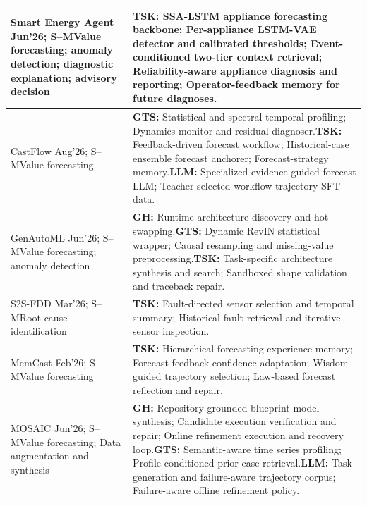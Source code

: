 \documentclass[preprints,article,submit,moreauthors]{Definitions/mdpi}
\newcommand{\typeSMshort}{\textsf{S--M}}
\begin{document}
\begin{longtable}{@{}>{\raggedright\arraybackslash}p{}p{}@{}}
Smart Energy Agent \citep{smartenergyagent2026} Jun'26; \typeSMshort{}\newline Value forecasting; anomaly detection; diagnostic explanation; advisory decision & \textbf{TSK:} SSA-LSTM appliance forecasting backbone; Per-appliance LSTM-VAE detector and calibrated thresholds; Event-conditioned two-tier context retrieval; Reliability-aware appliance diagnosis and reporting; Operator-feedback memory for future diagnoses.\\\midrule
CastFlow \citep{castflow2026} Aug'26; \typeSMshort{}\newline Value forecasting & \textbf{GTS:} Statistical and spectral temporal profiling; Dynamics monitor and residual diagnoser.\newline\textbf{TSK:} Feedback-driven forecast workflow; Historical-case ensemble forecast anchorer; Forecast-strategy memory.\newline\textbf{LLM:} Specialized evidence-guided forecast LLM; Teacher-selected workflow trajectory SFT data.\\\midrule
GenAutoML \citep{genautoml2026} Jun'26; \typeSMshort{}\newline Value forecasting; anomaly detection & \textbf{GH:} Runtime architecture discovery and hot-swapping.\newline\textbf{GTS:} Dynamic RevIN statistical wrapper; Causal resampling and missing-value preprocessing.\newline\textbf{TSK:} Task-specific architecture synthesis and search; Sandboxed shape validation and traceback repair.\\\midrule
S2S-FDD \citep{s2sfdd2026} Mar'26; \typeSMshort{}\newline Root cause identification & \textbf{TSK:} Fault-directed sensor selection and temporal summary; Historical fault retrieval and iterative sensor inspection.\\\midrule
MemCast \citep{memcast2026} Feb'26; \typeSMshort{}\newline Value forecasting & \textbf{TSK:} Hierarchical forecasting experience memory; Forecast-feedback confidence adaptation; Wisdom-guided trajectory selection; Law-based forecast reflection and repair.\\\midrule
MOSAIC \citep{mosaic2026} Jun'26; \typeSMshort{}\newline Value forecasting; Data augmentation and synthesis & \textbf{GH:} Repository-grounded blueprint model synthesis; Candidate execution verification and repair; Online refinement execution and recovery loop.\newline\textbf{GTS:} Semantic-aware time series profiling; Profile-conditioned prior-case retrieval.\newline\textbf{LLM:} Task-generation and failure-aware trajectory corpus; Failure-aware offline refinement policy.\\\midrule

\end{longtable}
\end{document}
